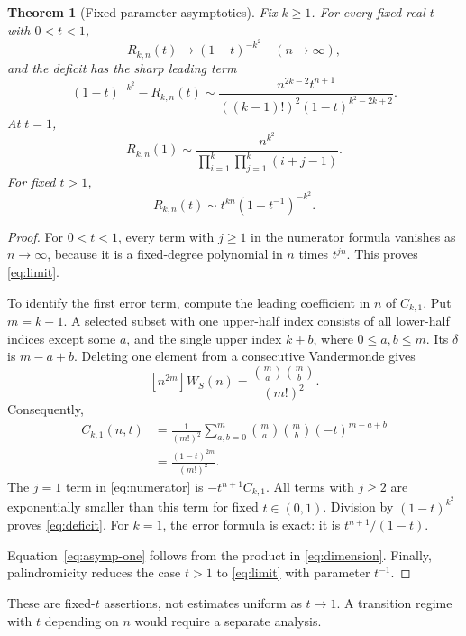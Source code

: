 \documentclass[11pt,a4paper]{article}
\newtheorem{theorem}{Theorem}[section]
\theoremstyle{definition}
\theoremstyle{remark}
\numberwithin{equation}{section}
\begin{document}
\begin{theorem}[Fixed-parameter asymptotics]
\label{thm:asymptotics}
Fix \(k\ge1\). For every fixed real \(t\) with \(0<t<1\),
\begin{equation}
 R_{k,n}(t)\longrightarrow(1-t)^{-k^2}
 \quad(n\to\infty),
 \label{eq:limit}
\end{equation}
and the deficit has the sharp leading term
\begin{equation}
 (1-t)^{-k^2}-R_{k,n}(t)
 \sim\frac{n^{2k-2}t^{n+1}}
 {((k-1)!)^2(1-t)^{k^2-2k+2}}.
 \label{eq:deficit}
\end{equation}
At \(t=1\),
\begin{equation}
 R_{k,n}(1)\sim
 \frac{n^{k^2}}{\displaystyle\prod_{i=1}^{k}\prod_{j=1}^{k}(i+j-1)}.
 \label{eq:asymp-one}
\end{equation}
For fixed \(t>1\),
\begin{equation}
 R_{k,n}(t)\sim t^{kn}(1-t^{-1})^{-k^2}.
 \label{eq:asymp-large}
\end{equation}
\end{theorem}
\begin{proof}
For \(0<t<1\), every term with \(j\ge1\) in the numerator formula
vanishes as \(n\to\infty\), because it is a fixed-degree polynomial in
\(n\) times \(t^{jn}\). This proves \eqref{eq:limit}.

To identify the first error term, compute the leading coefficient in
\(n\) of \(C_{k,1}\). Put \(m=k-1\). A selected subset with one
upper-half index consists of all lower-half indices except some \(a\),
and the single upper index \(k+b\), where \(0\le a,b\le m\). Its
\(\delta\) is \(m-a+b\). Deleting one element from a consecutive
Vandermonde gives
\[
 [n^{2m}]W_S(n)=\frac{\binom ma\binom mb}{(m!)^2}.
\]
Consequently,
\begin{align*}
 [n^{2k-2}]C_{k,1}(n,t)
 &=\frac{1}{(m!)^2}
   \sum_{a,b=0}^{m}\binom ma\binom mb(-t)^{m-a+b}\\
 &=\frac{(1-t)^{2m}}{(m!)^2}.
\end{align*}
The \(j=1\) term in \eqref{eq:numerator} is
\(-t^{n+1}C_{k,1}\). All terms with \(j\ge2\) are exponentially
smaller than this term for fixed \(t\in(0,1)\). Division by
\((1-t)^{k^2}\) proves \eqref{eq:deficit}. For \(k=1\), the error
formula is exact: it is \(t^{n+1}/(1-t)\).

Equation~\eqref{eq:asymp-one} follows from the product in
\eqref{eq:dimension}. Finally, palindromicity reduces the case \(t>1\)
to \eqref{eq:limit} with parameter \(t^{-1}\).
\end{proof}
These are fixed-\(t\) assertions, not estimates uniform as \(t\to1\).
A transition regime with \(t\) depending on \(n\) would require a
separate analysis.
\end{document}
